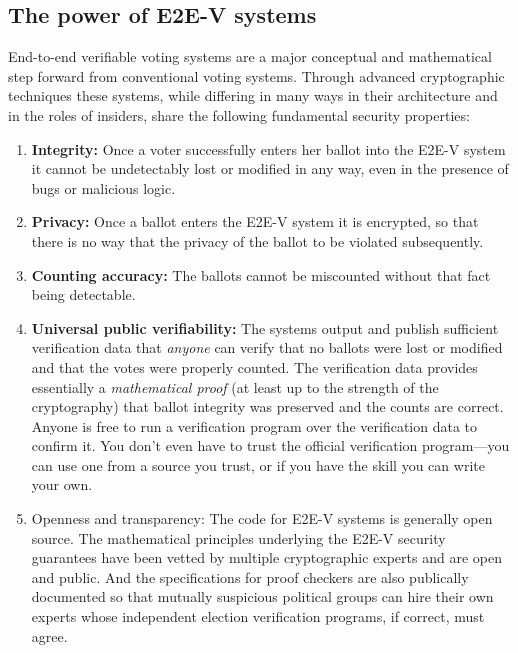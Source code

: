 \subsection{The power of E2E-V systems}

End-to-end verifiable voting systems are a major conceptual and
mathematical step forward from conventional voting systems. Through
advanced cryptographic techniques these systems, while differing in
many ways in their architecture and in the roles of insiders, share
the following fundamental security properties:

\begin{enumerate}[label={\alph*})]
\item \textbf{Integrity:} Once a voter successfully enters her ballot
  into the E2E-V system it cannot be undetectably lost or modified in
  any way, even in the presence of bugs or malicious logic.

\item \textbf{Privacy:} Once a ballot enters the E2E-V system it is
  encrypted, so that there is no way that the privacy of the ballot to
  be violated subsequently.

\item \textbf{Counting accuracy:} The ballots cannot be miscounted
  without that fact being detectable.

\item \textbf{Universal public verifiability:} The systems output and
  publish sufficient verification data that \emph{anyone} can verify
  that no ballots were lost or modified and that the votes were
  properly counted. The verification data provides essentially a
  \emph{mathematical proof} (at least up to the strength of the
  cryptography) that ballot integrity was preserved and the counts are
  correct. Anyone is free to run a verification program over the
  verification data to confirm it. You don't even have to trust the
  official verification program---you can use one from a source you
  trust, or if you have the skill you can write your own.

\item Openness and transparency: The code for E2E-V systems is
  generally open source. The mathematical principles underlying the
  E2E-V security guarantees have been vetted by multiple cryptographic
  experts and are open and public. And the specifications for proof
  checkers are also publically documented so that mutually suspicious
  political groups can hire their own experts whose independent
  election verification programs, if correct, must agree.
\end{enumerate}

